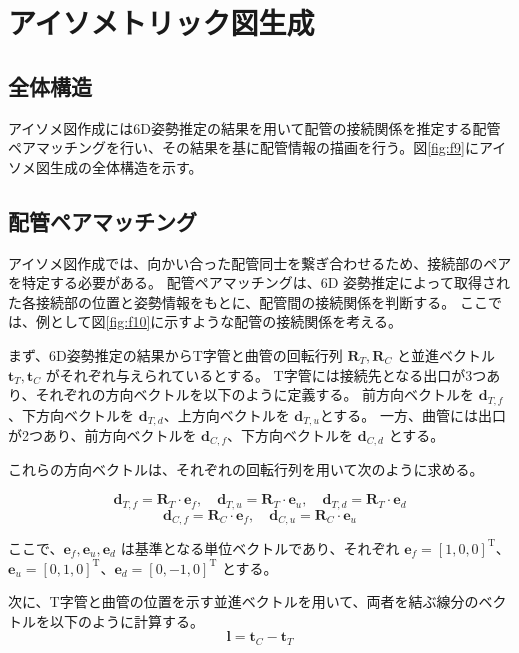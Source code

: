 \chapter{アイソメトリック図生成}
\section{全体構造}
アイソメ図作成には6D姿勢推定の結果を用いて配管の接続関係を推定する配管ペアマッチングを行い、その結果を基に配管情報の描画を行う。図\ref{fig:f9}にアイソメ図生成の全体構造を示す。

\section{配管ペアマッチング}
アイソメ図作成では、向かい合った配管同士を繋ぎ合わせるため、接続部のペアを特定する必要がある。
配管ペアマッチングは、6D 姿勢推定によって取得された各接続部の位置と姿勢情報をもとに、配管間の接続関係を判断する。
ここでは、例として図\ref{fig:f10}に示すような配管の接続関係を考える。

まず、6D姿勢推定の結果からT字管と曲管の回転行列 $\mathbf{R}_T, \mathbf{R}_C$ と並進ベクトル $\mathbf{t}_T, \mathbf{t}_C$ がそれぞれ与えられているとする。
T字管には接続先となる出口が3つあり、それぞれの方向ベクトルを以下のように定義する。
前方向ベクトルを $\mathbf{d}_{T,f}$、下方向ベクトルを $\mathbf{d}_{T,d}$、上方向ベクトルを $\mathbf{d}_{T,u}$とする。
一方、曲管には出口が2つあり、前方向ベクトルを $\mathbf{d}_{C,f}$、下方向ベクトルを $\mathbf{d}_{C,d}$ とする。

これらの方向ベクトルは、それぞれの回転行列を用いて次のように求める。

\[
\mathbf{d}_{T,f} = \mathbf{R}_T \cdot \mathbf{e}_f, \quad 
\mathbf{d}_{T,u} = \mathbf{R}_T \cdot \mathbf{e}_u, \quad 
\mathbf{d}_{T,d} = \mathbf{R}_T \cdot \mathbf{e}_d
\]
\[
\mathbf{d}_{C,f} = \mathbf{R}_C \cdot \mathbf{e}_f, \quad 
\mathbf{d}_{C,u} = \mathbf{R}_C \cdot \mathbf{e}_u
\]

ここで、$\mathbf{e}_f, \mathbf{e}_u, \mathbf{e}_d$ は基準となる単位ベクトルであり、それぞれ $\mathbf{e}_f = [1, 0, 0]^\mathrm{T}$、$\mathbf{e}_u = [0, 1, 0]^\mathrm{T}$、$\mathbf{e}_d = [0, -1, 0]^\mathrm{T}$ とする。

次に、T字管と曲管の位置を示す並進ベクトルを用いて、両者を結ぶ線分のベクトルを以下のように計算する。
\[
\mathbf{l} = \mathbf{t}_C - \mathbf{t}_T
\]

